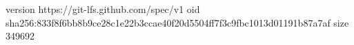 version https://git-lfs.github.com/spec/v1
oid sha256:833f8f6bb8b9ce28c1e22b3ccae40f20d5504ff7f3c9fbc1013d01191b87a7af
size 349692
